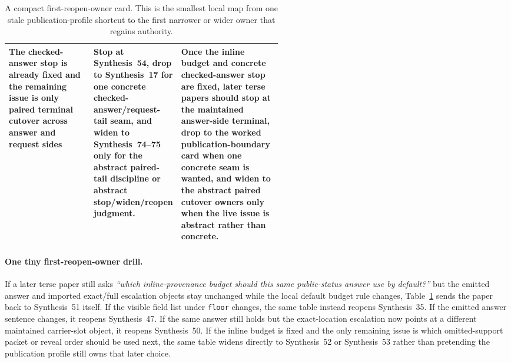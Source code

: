 \documentclass[11pt]{article}
\begin{document}
\begin{table}[t]
\begin{tabularx}{\linewidth}{@{}p{0.31\linewidth}p{0.23\linewidth}X@{}}
The checked-answer stop is already fixed and the remaining issue is only paired terminal cutover across answer and request sides & Stop at \textbf{Synthesis~54}, drop to \textbf{Synthesis~17} for one concrete checked-answer/request-tail seam, and widen to \textbf{Synthesis~74--75} only for the abstract paired-tail discipline or abstract stop/widen/reopen judgment. & Once the inline budget and concrete checked-answer stop are fixed, later terse papers should stop at the maintained answer-side terminal, drop to the worked publication-boundary card when one concrete seam is wanted, and widen to the abstract paired cutover owners only when the live issue is abstract rather than concrete. \\
\bottomrule
\end{tabularx}
\caption{A compact first-reopen-owner card. This is the smallest local map from one stale publication-profile shortcut to the first narrower or wider owner that regains authority.}
\label{tab:first-reopen-owner-card-answer-publication-profile}
\end{table}

\paragraph{One tiny first-reopen-owner drill.}
If a later terse paper still asks \emph{``which inline-provenance budget should this same public-status answer use by default?''} but the emitted answer and imported exact/full escalation objects stay unchanged while the local default budget rule changes, Table~\ref{tab:first-reopen-owner-card-answer-publication-profile} sends the paper back to Synthesis~51 itself. If the visible field list under \nolinkurl{floor} changes, the same table instead reopens Synthesis~35. If the emitted answer sentence changes, it reopens Synthesis~47. If the same answer still holds but the exact-location escalation now points at a different maintained carrier-slot object, it reopens Synthesis~50. If the inline budget is fixed and the only remaining issue is which omitted-support packet or reveal order should be used next, the same table widens directly to Synthesis~52 or Synthesis~53 rather than pretending the publication profile still owns that later choice.\cite{series:workedexample,series:challengeanswerescalationladders}
\end{document}

